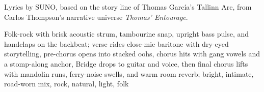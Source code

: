 
\begin{notes}
Lyrics by SUNO, based on the story line of Thomas García's Tallinn Arc, from Carlos Thompson's narrative universe \emph{Thomas’ Entourage}.
\end{notes}
\begin{style}
Folk-rock with brisk acoustic strum, tambourine snap, upright bass pulse, and handclaps on the backbeat; verse rides close-mic baritone with dry-eyed storytelling, pre-chorus opens into stacked oohs, chorus hits with gang vowels and a stomp-along anchor, Bridge drops to guitar and voice, then final chorus lifts with mandolin runs, ferry-noise swells, and warm room reverb; bright, intimate, road-worn mix, rock, natural, light, folk
\end{style}
